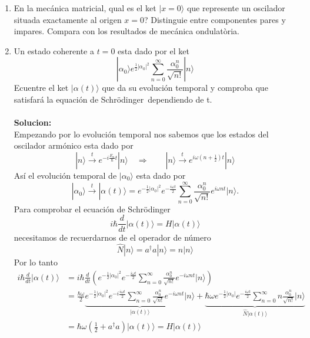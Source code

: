 \begin{enumerate}
\item En la mecánica matricial, qual es el ket $|x =0 \rangle$ que represente un
oscilador situada exactamente al origen $x=0$? Distinguie entre componentes
pares y impares. Compara con los resultados de mecánica ondulatòria.

\item Un estado coherente a $t=0$ esta dado por el ket
$$
	| \alpha_0 \rangle e^{\frac{1}{2} |\alpha_0|^2} \sum_{n=0}^{\infty}
	\frac{\alpha_0^n}{\sqrt{n!}} |n\rangle 
$$
Ecuentre el ket $|\alpha(t)\rangle$ que da su evolución temporal y comproba que
satisfará la equación de Schrödinger dependiendo de t. \\\\
\textbf{Solucion:} \\
Empezando por lo evolución temporal nos sabemos que los estados del oscilador
armónico esta dado por
$$	
	|n\rangle \overset{t}{\longrightarrow} e^{-i\frac{E_n}{\hbar}t} |n\rangle
\quad \Rightarrow \qquad |n\rangle \overset{t}{\longrightarrow} e^{i\omega(n +
\frac{1}{2}) t} |n\rangle
$$
Así el evolución temporal de $|\alpha_0\rangle$ esta dado por
$$
	|\alpha_0\rangle \overset{t}{\longrightarrow} |\alpha(t) \rangle =
e^{-\frac{1}{2} |\alpha_0|^2} e^{-\frac{i\omega t}{2}} \sum_{n=0}^{\infty}
\frac{\alpha_0^n}{\sqrt{n!}} e^{i\omega n t} |n\rangle.
$$
Para comprobar el ecuación de Schrödinger
$$
	i \hbar \frac{d}{dt} |\alpha(t) \rangle = H | \alpha(t) \rangle
$$
necesitamos de recuerdarnos de el operador de número
$$
	\hat N | n \rangle = a^\dagger a | n\rangle = n | n \rangle
$$ 
Por lo tanto 
\begin{align*}
	i \hbar \frac{d}{dt} |\alpha(t) \rangle &= i \hbar
\frac{d}{dt} \left(e^{-\frac{1}{2} |\alpha_0|^2} e^{-\frac{i \omega t}{2}} \sum_{n=0}^{\infty}
\frac{\alpha_0^n}{\sqrt{n!}} e^{-i\omega n t} | n\rangle \right) \\
	&= \frac{\hbar \omega}{2} \underbrace{e^{-\frac{1}{2}|\alpha_0|^2}
e^{-i\frac{i \omega t}{2}} \sum_{n=0}^\infty \frac{\alpha_0^n}{\sqrt{n!}}
e^{-i\omega n t} | n\rangle}_{|\alpha(t)\rangle} + \underbrace{\hbar \omega
e^{-\frac{1}{2} |\alpha_0|} e^{-\frac{i\omega t}{2}} \sum_{n=0}^\infty n
\frac{\alpha_0^n}{\sqrt{n!}}|n\rangle}_{\hat N | \alpha(t) \rangle}  \\
	&= \hbar \omega \left(\frac{1}{2} + a^\dagger a \right) |\alpha(t)\rangle = H | \alpha(t) \rangle
\end{align*}


\end{enumerate}
